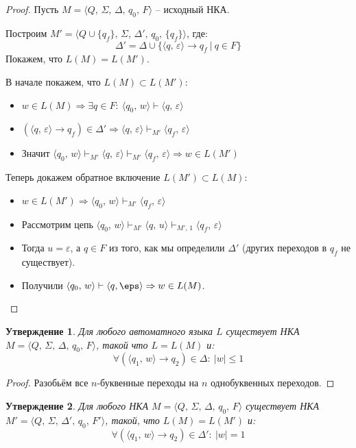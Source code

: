 \documentclass[a4paper,12pt]{article}
\renewcommand{\leq}{\ensuremath{\leqslant}}
\theoremstyle{plain}
\newtheorem{proposition}{Утверждение}[subsection]
\theoremstyle{definition}
\theoremstyle{remark}
\begin{document}
\begin{proof}
	Пусть $M = \langle Q,\,\Sigma,\, \Delta,\, q_0,\, F \rangle$ -- исходный НКА.

	Построим $M' = \langle Q \cup \{q_f\},\,\Sigma,\, \Delta',\, q_0,\, \{q_f\} \rangle$, где:
	\[
		\Delta' = \Delta \cup \{\langle q,\, \varepsilon\rangle \to q_f \:|\: q \in F\}
	\]
	Покажем, что $L(M) = L(M')$.

	В начале покажем, что $L(M) \subset L(M')$:
	\begin{itemize}
		\item $w \in L(M) \Rightarrow \exists q \in F:\: \langle q_0,\, w\rangle \vdash \langle q,\, \varepsilon\rangle$
		\item $(\langle q,\, \varepsilon\rangle \to q_f) \in \Delta' \Rightarrow \langle q,\, \varepsilon\rangle \vdash_{M'} \langle q_f,\, \varepsilon\rangle$
		\item Значит $\langle q_0,\, w\rangle \vdash_{M'} \langle q,\, \varepsilon\rangle \vdash_{M'} \langle q_f,\, \varepsilon\rangle \Rightarrow w \in L(M')$
	\end{itemize}
	Теперь докажем обратное включение $L(M') \subset L(M)$:
	\begin{itemize}
		\item $w \in L(M') \Rightarrow \langle q_0,\, w\rangle \vdash_{M'} \langle q_f,\, \varepsilon\rangle$
		\item Рассмотрим цепь $\langle q_0,\, w\rangle \vdash_{M'} \langle q,\, u\rangle \vdash_{M',\, 1} \langle q_f,\, \varepsilon\rangle$
		\item Тогда $u = \varepsilon$, а $q \in F$ из того, как мы определили $\Delta'$ (других переходов в $q_f$ не существует).
		\item Получили $\langle q_0,\, w\rangle \vdash \langle q, \eps \rangle \Rightarrow w \in L(M)$.
	\end{itemize}
\end{proof}

\begin{proposition}
	Для любого автоматного языка $L$ существует НКА $M = \langle Q,\,\Sigma,\, \Delta,\, q_0,\, F \rangle$, такой что $L = L(M)$ и:
	\[
		\forall (\langle q_1,\, w\rangle \to q_2) \in \Delta :\: |w| \leq 1
	\]
\end{proposition}

\begin{proof}
	Разобьём все $n$-буквенные переходы на $n$ однобуквенных переходов.
\end{proof}

\begin{proposition}
	Для любого НКА $M = \langle Q,\,\Sigma,\, \Delta,\, q_0,\, F \rangle$ существует НКА $M' = \langle Q,\,\Sigma,\, \Delta',\, q_0,\, F' \rangle$, такой, что $L(M) = L(M')$ и:
	\[
		\forall (\langle q_1,\, w\rangle \to q_2) \in \Delta' :\: |w| = 1
	\]
\end{proposition}
\end{document}
